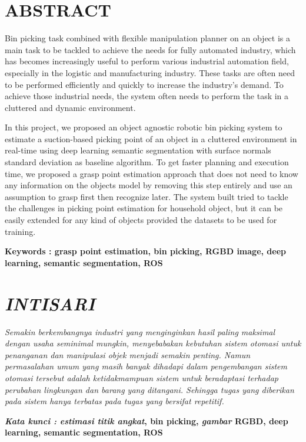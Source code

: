 \documentclass[../thesis.tex]{subfiles}
\begin{document}
\chapter*{ABSTRACT}%
\normalfont
\vspace{1.0cm}
\begin{singlespacing}%
{}

Bin picking task combined with flexible manipulation planner on an object is a main task to be tackled to achieve the needs for fully automated industry, which has becomes increasingly useful to perform various industrial automation field, especially in the logistic and manufacturing industry.
These tasks are often need to be performed efficiently and quickly to increase the industry's demand.
To achieve those industrial needs, the system often needs to perform the task in a cluttered and dynamic environment.

In this project, we proposed an object agnostic robotic bin picking system to estimate a suction-based picking point of an object in a cluttered environment in real-time using deep learning semantic segmentation with surface normals standard deviation as baseline algorithm. 
To get faster planning and execution time, we proposed a grasp point estimation approach that does not need to know any information on the objects model by removing this step entirely and use an assumption to grasp first then recognize later.
The system built tried to tackle the challenges in picking point estimation for household object, but it can be easily extended for any kind of objects provided the datasets to be used for training.

\bigskip
\noindent
\textbf{Keywords : grasp point estimation, bin picking, RGBD image, deep learning, semantic segmentation, ROS}
\end{singlespacing}

\chapter*{\emph{INTISARI}}%
\normalfont
\vspace{1.0cm}
\begin{singlespacing}%
{}

\emph{
Semakin berkembangnya industri yang menginginkan hasil paling maksimal dengan usaha seminimal mungkin, menyebabakan kebutuhan sistem otomasi untuk penanganan dan manipulasi objek menjadi semakin penting.
Namun permasalahan umum yang masih banyak dihadapi dalam pengembangan sistem otomasi tersebut adalah ketidakmampuan sistem untuk beradaptasi terhadap perubahan lingkungan dan barang yang ditangani.
Sehingga tugas yang diberikan pada sistem hanya terbatas pada tugas yang bersifat repetitif.
}

\bigskip
\noindent

\textbf{\emph{Kata kunci : estimasi titik angkat}, bin picking, \emph{gambar} RGBD, deep learning, semantic segmentation, ROS}
\end{singlespacing}
\end{document}
